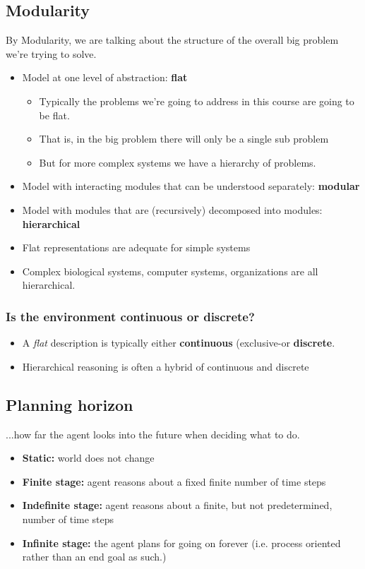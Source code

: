 \documentclass[12pt]{article}
\begin{document}
\newpage
\subsection{Modularity}

By Modularity, we are talking about the structure of the overall big problem we're trying to solve.

\begin{itemize}
    \item Model at one level of abstraction: \textbf{flat}
    \begin{itemize}
        \item Typically the problems we're going to address in this course are going to be flat.
        \item That is, in the big problem there will only be a single sub problem
        \item But for more complex systems we have a hierarchy of problems.
    \end{itemize}
    \item Model with interacting modules that can be understood separately: \textbf{modular}
    \item Model with modules that are (recursively) decomposed into modules: \textbf{hierarchical}
    \item Flat representations are adequate for simple systems
    \item Complex biological systems, computer systems, organizations are all hierarchical.
\end{itemize}

\subsubsection{Is the environment continuous or discrete?}
\begin{itemize}
    \item A \emph{flat} description is typically either \textbf{continuous} (exclusive-or \textbf{discrete}.
    \item Hierarchical reasoning is often a hybrid of continuous and discrete
\end{itemize}

\subsection{Planning horizon}
...how far the agent looks into the future when deciding what to do.

\begin{itemize}
    \item \textbf{Static:} world does not change
    \item \textbf{Finite stage:} agent reasons about a fixed finite number of time steps
    \item \textbf{Indefinite stage:} agent reasons about a finite, but not predetermined, number of time
steps
    \item \textbf{Infinite stage:} the agent plans for going on forever (i.e. process oriented rather than an end goal as such.)
\end{itemize}
\end{document}
